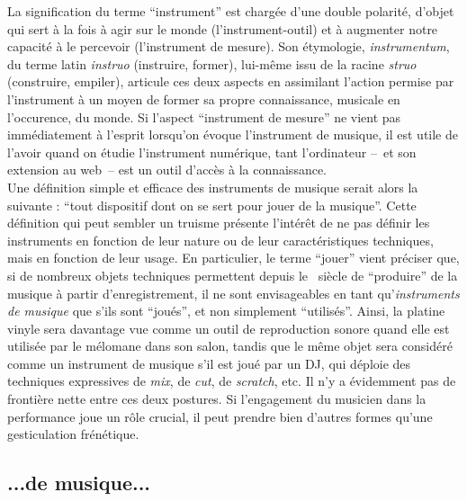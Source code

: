 \noindent La signification du terme ``instrument'' est chargée d'une double polarité, d'objet qui sert à la fois à agir sur le monde (l'instrument-outil) et à augmenter notre capacité à le percevoir (l'instrument de mesure). Son étymologie, \textit{instrumentum}, du terme latin \textit{instruo} (instruire, former), lui-même issu de la racine \textit{struo} (construire, empiler), articule ces deux aspects en assimilant l'action permise par l'instrument à un moyen de former sa propre connaissance, musicale en l'occurence, du monde. Si l'aspect ``instrument de mesure'' ne vient pas immédiatement à l'esprit lorsqu'on évoque l'instrument de musique, il est utile de l'avoir quand on étudie l'instrument numérique, tant l'ordinateur --~et son extension au web~-- est un outil d'accès à la connaissance.\\
\indent Une définition simple et efficace des instruments de musique serait alors la suivante : ``tout dispositif dont on se sert pour jouer de la musique''. Cette définition qui peut sembler un truisme présente l'intérêt de ne pas définir les instruments en fonction de leur nature ou de leur caractéristiques techniques, mais en fonction de leur usage. En particulier, le terme ``jouer'' vient préciser que, si de nombreux objets techniques permettent depuis le ~siècle de ``produire'' de la musique à partir d'enregistrement, il ne sont envisageables en tant qu'\textit{instruments de musique} que s'ils sont ``joués'', et non simplement ``utilisés''. Ainsi, la platine vinyle sera davantage vue comme un outil de reproduction sonore quand elle est utilisée par le mélomane dans son salon, tandis que le même objet sera considéré comme un instrument de musique s'il est joué par un \gls{DJ}, qui déploie des techniques expressives de \textit{mix}, de \textit{cut}, de \textit{scratch}, etc. Il n'y a évidemment pas de frontière nette entre ces deux postures. Si l'engagement du musicien dans la performance joue un rôle crucial, il peut prendre bien d'autres formes qu'une gesticulation frénétique.\\

\subsection*{...de musique...}

